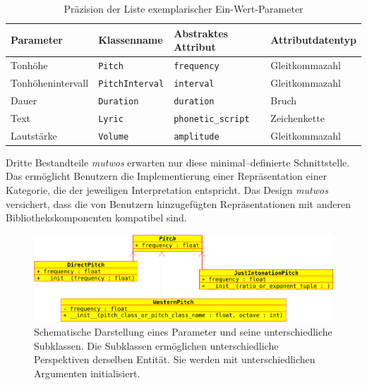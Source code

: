 \documentclass[12pt,a4paper,ngerman]{article}
\begin{document}
\begin{table}[h!]
    \begin{center}
        \begin{tabular}{l l l l} 
            \hline
            Parameter & Klassenname & Abstraktes Attribut & Attributdatentyp \\ [0.5ex] 
            \hline\hline
            Tonhöhe & \texttt{Pitch} & \texttt{frequency} & Gleitkommazahl \\ 
            Tonhöhenintervall & \texttt{PitchInterval} & \texttt{interval} & Gleitkommazahl \\ 
            Dauer & \texttt{Duration} & \texttt{duration} & Bruch \\ 
            Text & \texttt{Lyric} & \texttt{phonetic\_script} & Zeichenkette \\ 
            Lautstärke & \texttt{Volume} & \texttt{amplitude} & Gleitkommazahl \\ [1ex] 
            \hline
        \end{tabular}
    \end{center}

    \caption{Präzision der Liste exemplarischer Ein-Wert-Parameter}
\end{table}

Dritte Bestandteile \emph{mutwos} erwarten nur diese minimal--definierte Schnittstelle.
Das ermöglicht Benutzern die Implementierung einer Repräsentation einer Kategorie, die der jeweiligen Interpretation entspricht.
Das Design \emph{mutwos} versichert, dass die von Benutzern hinzugefügten Repräsentationen mit anderen Bibliothekskomponenten kompatibel sind.

\begin{figure}[h!]
    \includegraphics[scale=0.4]{uml_diagrams/pitches.png}

    \caption{%
        Schematische Darstellung eines Parameter und seine unterschiedliche Subklassen.
        Die Subklassen ermöglichen unterschiedliche Perspektiven derselben Entität.
        Sie werden mit unterschiedlichen Argumenten initialisiert.
    }

\end{figure}
\end{document}

